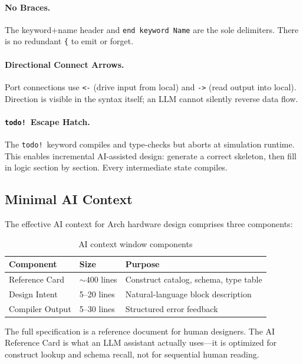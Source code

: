 \documentclass[11pt,twocolumn]{article}
\begin{document}
\paragraph{No Braces.} The keyword+name header and \texttt{end keyword Name} are the sole delimiters. There is no redundant \texttt{\{} to emit or forget.

\paragraph{Directional Connect Arrows.} Port connections use \texttt{<-} (drive input from local) and \texttt{->} (read output into local). Direction is visible in the syntax itself; an LLM cannot silently reverse data flow.

\paragraph{\texttt{todo!}\ Escape Hatch.} The \texttt{todo!}\ keyword compiles and type-checks but aborts at simulation runtime. This enables incremental AI-assisted design: generate a correct skeleton, then fill in logic section by section. Every intermediate state compiles.

\subsection{Minimal AI Context}

The effective AI context for Arch hardware design comprises three components:

\begin{table}[t]
\centering
\caption{AI context window components}
\label{tab:aicontext}
\small
\begin{tabular}{@{}llp{3.2cm}@{}}
\toprule
\textbf{Component} & \textbf{Size} & \textbf{Purpose} \\
\midrule
Reference Card & ${\sim}400$ lines & Construct catalog, schema, type table \\
Design Intent & 5--20 lines & Natural-language block description \\
Compiler Output & 5--30 lines & Structured error feedback \\
\bottomrule
\end{tabular}
\end{table}

The full specification is a reference document for human designers.
The AI Reference Card is what an LLM assistant actually uses---it is optimized for construct lookup and schema recall, not for sequential human reading.
\end{document}
